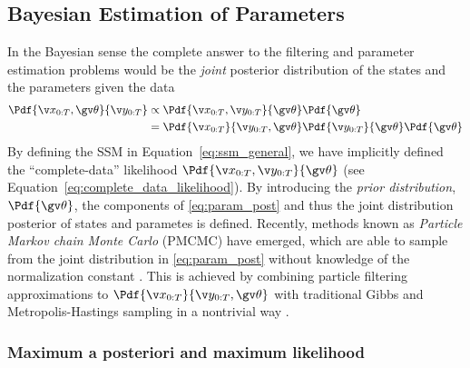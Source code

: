\subsection{Bayesian Estimation of Parameters}%
In the Bayesian sense the complete 
answer to the filtering and parameter estimation problems would be the \emph{joint} posterior distribution of the states
and the parameters given the data
\begin{align}
	\Pdf{\X,\Th}{\Y} &\propto \Pdf{\X,\Y}{\Th}\Pdf{\Th}\\
	&= \Pdf{\X}{\Y,\Th}\Pdf{\Y}{\Th}\Pdf{\Th}
	\label{eq:param_post}
\end{align}
By defining the SSM in Equation~\eqref{eq:ssm_general}, we have
implicitly defined the ``complete-data'' likelihood $\Pdf{\X,\Y}{\Th}$
(see Equation~\eqref{eq:complete_data_likelihood}).
By introducing the \emph{prior distribution}, $\Pdf{\Th}$,
the components of \eqref{eq:param_post} and thus the joint distribution posterior
of states and parametes is defined. Recently, methods known as
\emph{Particle Markov chain Monte Carlo} (PMCMC) have emerged,
which are able to sample from the joint distribution in \eqref{eq:param_post}
without knowledge of the normalization constant \parencite{Andrieu2010}.
This is achieved by combining particle filtering approximations to $\Pdf{\X}{\Y,\Th}$ 
with traditional Gibbs and Metropolis-Hastings sampling in a nontrivial way 
\parencite{Andrieu2010,gelman2004}.

\subsubsection{Maximum a posteriori and maximum likelihood}


